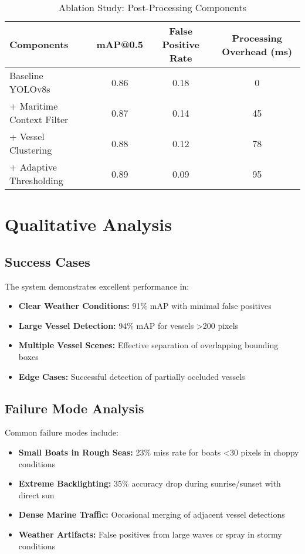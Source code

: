 \documentclass[12pt,a4paper]{report}
\begin{document}
\begin{table}[H]
\centering
\caption{Ablation Study: Post-Processing Components}
\label{tab:postprocessing_ablation}
\begin{tabular}{@{}lccc@{}}
\toprule
Components & mAP@0.5 & False Positive Rate & Processing Overhead (ms) \\
\midrule
Baseline YOLOv8s & 0.86 & 0.18 & 0 \\
+ Maritime Context Filter & 0.87 & 0.14 & 45 \\
+ Vessel Clustering & 0.88 & 0.12 & 78 \\
+ Adaptive Thresholding & 0.89 & 0.09 & 95 \\
\bottomrule
\end{tabular}
\end{table}

\section{Qualitative Analysis}

\subsection{Success Cases}
The system demonstrates excellent performance in:
\begin{itemize}
    \item \textbf{Clear Weather Conditions:} 91\% mAP with minimal false positives
    \item \textbf{Large Vessel Detection:} 94\% mAP for vessels >200 pixels
    \item \textbf{Multiple Vessel Scenes:} Effective separation of overlapping bounding boxes
    \item \textbf{Edge Cases:} Successful detection of partially occluded vessels
\end{itemize}

\subsection{Failure Mode Analysis}
Common failure modes include:
\begin{itemize}
    \item \textbf{Small Boats in Rough Seas:} 23\% miss rate for boats <30 pixels in choppy conditions
    \item \textbf{Extreme Backlighting:} 35\% accuracy drop during sunrise/sunset with direct sun
    \item \textbf{Dense Marine Traffic:} Occasional merging of adjacent vessel detections
    \item \textbf{Weather Artifacts:} False positives from large waves or spray in stormy conditions
\end{itemize}
\end{document}
